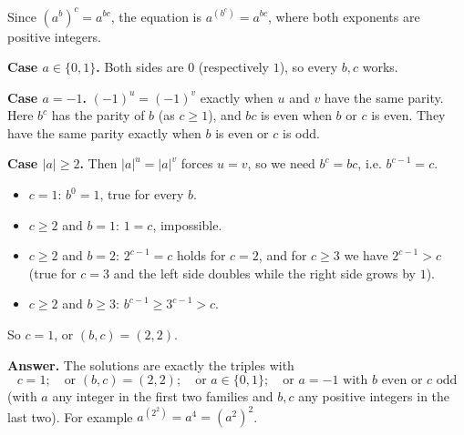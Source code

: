 Since $\left(a^b\right)^c=a^{bc}$, the equation is $a^{\left(b^c\right)}=a^{bc}$, where both exponents are positive integers.

\textbf{Case $a\in\{0,1\}$.} Both sides are $0$ (respectively $1$), so every $b,c$ works.

\textbf{Case $a=-1$.} $(-1)^u=(-1)^v$ exactly when $u$ and $v$ have the same parity. Here $b^c$ has the parity of $b$ (as $c\ge1$), and $bc$ is even when $b$ or $c$ is even. They have the same parity exactly when $b$ is even or $c$ is odd.

\textbf{Case $|a|\ge2$.} Then $|a|^u=|a|^v$ forces $u=v$, so we need $b^c=bc$, i.e. $b^{c-1}=c$.
\begin{itemize}
\item $c=1$: $b^0=1$, true for every $b$.
\item $c\ge2$ and $b=1$: $1=c$, impossible.
\item $c\ge2$ and $b=2$: $2^{c-1}=c$ holds for $c=2$, and for $c\ge3$ we have $2^{c-1}>c$ (true for $c=3$ and the left side doubles while the right side grows by $1$).
\item $c\ge2$ and $b\ge3$: $b^{c-1}\ge3^{c-1}>c$.
\end{itemize}
So $c=1$, or $(b,c)=(2,2)$.

\textbf{Answer.} The solutions are exactly the triples with
\[\boxed{c=1;\quad\text{or }(b,c)=(2,2);\quad\text{or }a\in\{0,1\};\quad\text{or }a=-1\text{ with }b\text{ even or }c\text{ odd}}\]
(with $a$ any integer in the first two families and $b,c$ any positive integers in the last two). For example $a^{\left(2^2\right)}=a^4=\left(a^2\right)^2$.
